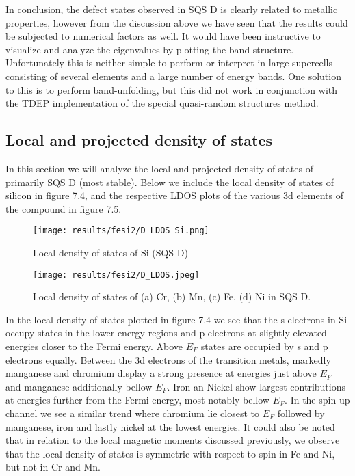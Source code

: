 In conclusion, the defect states observed in SQS D is clearly related to metallic properties, however from the discussion above we have seen that the results could be subjected to numerical factors as well. It would have been instructive to visualize and analyze the eigenvalues by plotting the band structure. Unfortunately this is neither simple to perform or interpret in large supercells consisting of several elements and a large number of energy bands. One solution to this is to perform band-unfolding, but this did not work in conjunction with the TDEP implementation of the special quasi-random structures method. 


\newpage
\subsection{Local and projected density of states}
In this section we will analyze the local and projected density of states of primarily SQS D (most stable). Below we include the local density of states of silicon in figure 7.4, and the respective LDOS plots of the various 3d elements of the compound in figure 7.5.  
  
\begin{figure}[H]
	\centering
	\texttt{[image: results/fesi2/D\_LDOS\_Si.png]}
	\caption{Local density of states of Si (SQS D)}
\end{figure} 

\begin{figure}[H]
	\centering
	\texttt{[image: results/fesi2/D\_LDOS.jpeg]}
	\caption{Local density of states of (a) Cr, (b) Mn, (c) Fe, (d) Ni in SQS D.}
\end{figure}   
  
In the local density of states plotted in figure 7.4 we see that the s-electrons in Si occupy states in the lower energy regions and p electrons at slightly elevated energies closer to the Fermi energy. Above $E_F$ states are occupied by s and p electrons equally. Between the 3d electrons of the transition metals, markedly manganese and chromium display a strong presence at energies just above $E_F$ and manganese additionally bellow $E_F$. Iron an Nickel show largest contributions at energies further from the Fermi energy, most notably bellow $E_F$. In the spin up channel we see a similar trend where chromium lie closest to $E_F$ followed by manganese, iron and lastly nickel at the lowest energies. It could also be noted that in relation to the local magnetic moments discussed previously, we observe that the local density of states is symmetric with respect to spin in Fe and Ni, but not in Cr and Mn. 


